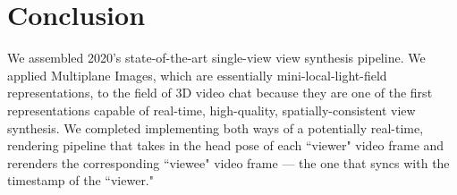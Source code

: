 \section{Conclusion}\label{sec:conclusion}

We assembled 2020’s state-of-the-art single-view view synthesis pipeline. We applied Multiplane Images, which are essentially mini-local-light-field representations, to the field of 3D video chat because they are one of the first representations capable of real-time, high-quality, spatially-consistent view synthesis. We completed implementing both ways of a potentially real-time, rendering pipeline that takes in the head pose of each ``viewer" video frame and rerenders the corresponding ``viewee" video frame --- the one that syncs with the timestamp of the ``viewer."
